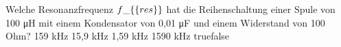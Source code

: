     {Welche Resonanzfrequenz $f\_\{\textrm\{res\}\}$ hat die Reihenschaltung einer Spule von 100 μH mit einem Kondensator von 0,01 μF und einem Widerstand von 100 Ohm?}
    {159 kHz}
    {15,9 kHz}
    {1,59 kHz}
    {1590 kHz}
    {true}{false}
